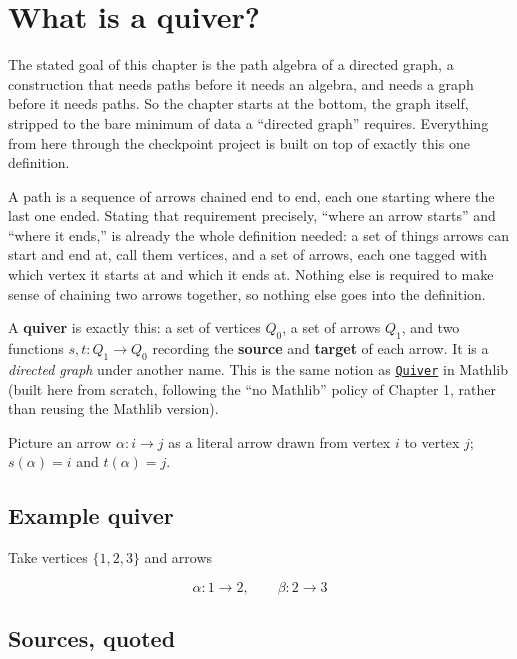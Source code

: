 \section{What is a quiver?}\label{sec:12-path-algebras:01-what-is-a-quiver:1}

The stated goal of this chapter is the path algebra of a directed graph, a construction that needs paths before it needs an algebra, and needs a graph before it needs paths. So the chapter starts at the bottom, the graph itself, stripped to the bare minimum of data a ``directed graph'' requires. Everything from here through the checkpoint project is built on top of exactly this one definition.

A path is a sequence of arrows chained end to end, each one starting where the last one ended. Stating that requirement precisely, ``where an arrow starts'' and ``where it ends,'' is already the whole definition needed: a set of things arrows can start and end at, call them vertices, and a set of arrows, each one tagged with which vertex it starts at and which it ends at. Nothing else is required to make sense of chaining two arrows together, so nothing else goes into the definition.

A \textbf{quiver} is exactly this: a set of vertices \(Q_0\), a set of arrows \(Q_1\), and two functions \(s, t : Q_1 \to Q_0\) recording the \textbf{source} and \textbf{target} of each arrow. It is a \emph{directed graph} under another name. This is the same notion as \href{https://loogle.lean-lang.org/?q=Quiver}{\texttt{Quiver}} in Mathlib (built here from scratch, following the ``no Mathlib'' policy of Chapter 1, rather than reusing the Mathlib version).

Picture an arrow \(\alpha : i \to j\) as a literal arrow drawn from vertex \(i\) to vertex \(j\); \(s(\alpha) = i\) and \(t(\alpha) = j\).

\subsection{Example quiver}\label{sec:12-path-algebras:01-what-is-a-quiver:2}

Take vertices \(\{1, 2, 3\}\) and arrows

\[
\alpha : 1 \to 2, \qquad \beta : 2 \to 3
\]

\subsection{Sources, quoted}\label{sec:12-path-algebras:01-what-is-a-quiver:3}

